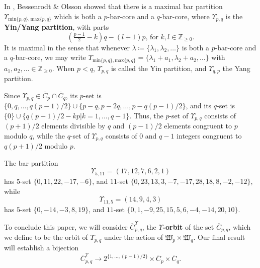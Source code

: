 \documentclass[ALCO, Unicode,published]{cedram}
\newcommand*\nicefrac[2]{#1/#2}
\begin{document}
In \cite{BO}, Bessenrodt \& Olsson showed that there is a maximal bar partition $\Upsilon_{\text{min}\{p,q\},\text{max}\{p,q\}}$ which is both a $p$-bar-core and a $q$-bar-core, where $\Upsilon_{p,q}$ is the \textbf{Yin/Yang partition}, with parts 
$$(\tfrac{p-1}{2}-k)q-(l+1)p\text{, for }k,l\in\mathbb{Z}_{\geq0}.$$ 
It is maximal in the sense that whenever $\lambda\coloneqq\{\lambda_1,\lambda_2,\dots\}$ is both a $p$-bar-core and a $q$-bar-core, we may write $\Upsilon_{\text{min}\{p,q\},\text{max}\{p,q\}}=\{\lambda_1+a_1,\lambda_2+a_2,\dots\}$ with $a_1,a_2,\dots\in\mathbb{Z}_{\geq0}$. When $p<q$, $\Upsilon_{p,q}$ is called the Yin partition, and $\Upsilon_{q,p}$ the Yang partition. 

Since $\Upsilon_{p,q}\in\overline{C}_p\cap\overline{C}_q$, its $p$-set is $\{0,q,\dots,\nicefrac{q(p-1)}{2}\}\cup\{p-q,p-2q,\dots,p-\nicefrac{q(p-1)}{2}\}$, and its $q$-set is $\{0\}\cup\{\nicefrac{q(p+1)}{2}-kp|k=1,\dots,q-1\}$. Thus, the $p$-set of $\Upsilon_{p,q}$ consists of $\nicefrac{(p+1)}{2}$ elements divisible by $q$ and $\nicefrac{(p-1)}{2}$ elements congruent to $p$ modulo $q$, while the $q$-set of $\Upsilon_{p,q}$ consists of $0$ and $q-1$ integers congruent to $\nicefrac{q(p+1)}{2}$ modulo $p$. 

\begin{exam}
The bar partition 
$$\Upsilon_{5,11}=(17,12,7,6,2,1)$$ 
has $5$-set $\{0,11,22,-17,-6\}$, and $11$-set $\{0,23,13,3,-7,-17,28,18,8,-2,-12\}$, while 
$$\Upsilon_{11,5}=(14,9,4,3)$$ 
has $5$-set $\{0,-14,-3,8,19\}$, and $11$-set $\{0,1,-9,25,15,5,6,-4,-14,20,10\}$.
\end{exam}

To conclude this paper, we will consider $\overline{C}^\Upsilon_{p,q}$, the $\Upsilon$\textbf{-orbit} of the set $\overline{C}_{p,q}$, which we define to be the orbit of $\Upsilon_{p,q}$ under the action of $\mathfrak{W}_p\times\mathfrak{W}_q$. Our final result will establish a bijection 
$$\overline{C}^\Upsilon_{p,q}\to2^{\{1,\dots,\nicefrac{(p-1)}{2}\}}\times\overline{C}_p\times\overline{C}_q.$$ 
\end{document}
